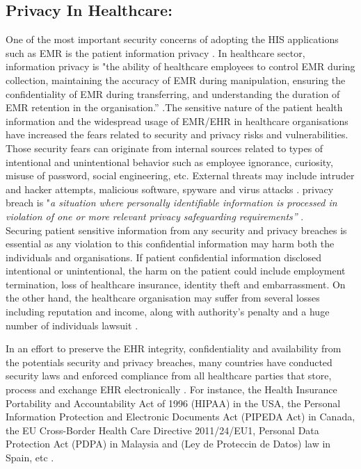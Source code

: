 \subsection{Privacy In Healthcare:}
One of the most important security concerns of adopting the HIS applications such as EMR is the patient information privacy \cite{Mahfuth2016}. In healthcare sector, information privacy is "the ability of healthcare employees to control EMR during collection, maintaining the accuracy of EMR during manipulation, ensuring the confidentiality of EMR during transferring, and understanding the duration of EMR retention in the organisation.”  \cite{Rahim2016}.The sensitive nature of the patient health information and the widespread usage of EMR/EHR in healthcare organisations have increased the fears related to security and privacy risks and vulnerabilities. Those security fears can originate from internal sources related to types of intentional and unintentional behavior such as employee ignorance, curiosity, misuse of password, social engineering, etc. External threats may include intruder and hacker attempts, malicious software, spyware and virus attacks  \cite{Samy2010b}. privacy breach is "\textit{a situation where personally identifiable information is processed in violation of one or more relevant privacy safeguarding requirements”} \cite{ISO/IEC}.\\Securing patient sensitive information from any security and privacy breaches is essential as any violation to this confidential information may harm both the individuals and organisations. If patient confidential information disclosed intentional or unintentional, the harm on the patient could include employment termination, loss of healthcare insurance, identity theft and embarrassment. On the other hand, the healthcare organisation may suffer from several losses including reputation and income, along with authority’s penalty and a huge number of individuals lawsuit \cite{Wartenberg2010,Culnan2016}. 

In an effort to preserve the EHR integrity, confidentiality and availability from the potentials security and privacy breaches, many countries have conducted security laws and enforced compliance from all healthcare parties that store, process and exchange EHR electronically \cite{Hsu,Samy2010,Rahim2016}. For instance, the Health Insurance Portability and Accountability Act of 1996
(HIPAA) in the USA, the Personal Information Protection and Electronic Documents Act (PIPEDA Act) in Canada, the EU Cross-Border Health Care Directive 2011/24/EU1, Personal Data Protection Act (PDPA) in Malaysia and (Ley de Proteccin de Datos) law in Spain, etc \cite{Bensefia2014,U.S.DepartmentofHealthandHumanServices}. 


